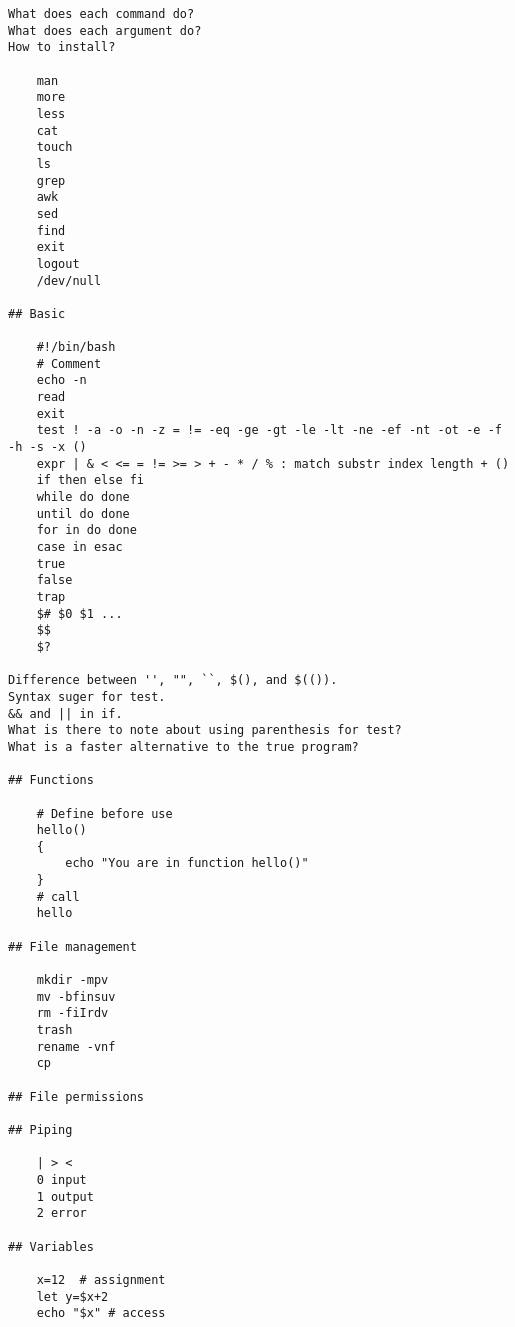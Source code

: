 \documentclass[twocolumn]{article}
\begin{document}
\begin{lstlisting}
What does each command do?
What does each argument do?
How to install?

    man
    more
    less
    cat
    touch
    ls
    grep
    awk
    sed
    find
    exit
    logout
    /dev/null

## Basic

    #!/bin/bash
    # Comment
    echo -n
    read
    exit
    test ! -a -o -n -z = != -eq -ge -gt -le -lt -ne -ef -nt -ot -e -f -h -s -x ()
    expr | & < <= = != >= > + - * / % : match substr index length + ()
    if then else fi
    while do done
    until do done
    for in do done
    case in esac
    true
    false
    trap
    $# $0 $1 ...
    $$
    $?

Difference between '', "", ``, $(), and $(()).
Syntax suger for test.
&& and || in if.
What is there to note about using parenthesis for test?
What is a faster alternative to the true program?

## Functions

    # Define before use
    hello()
    {
        echo "You are in function hello()"
    }
    # call
    hello

## File management

    mkdir -mpv
    mv -bfinsuv
    rm -fiIrdv
    trash
    rename -vnf
    cp

## File permissions

## Piping

    | > <
    0 input
    1 output
    2 error

## Variables

    x=12  # assignment
    let y=$x+2
    echo "$x" # access
\end{lstlisting}
\end{document}
